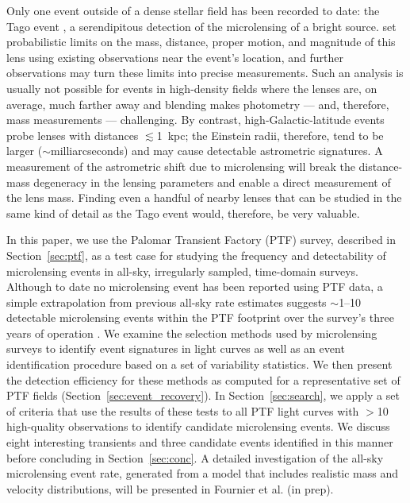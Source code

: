 \documentclass{emulateapj}
\begin{document}
Only one event outside of a dense stellar field has been recorded to date: the Tago event \citep{fukui2007, gaudi2008}, a serendipitous detection of the microlensing of a bright source. \cite{gaudi2008} set probabilistic limits on the mass, distance, proper motion, and magnitude of this lens using existing observations near the event's location, and further observations may turn these limits into precise measurements. Such an analysis is usually not possible for events in high-density fields where the lenses are, on average, much farther away and blending makes photometry --- and, therefore, mass measurements --- challenging. By contrast, high-Galactic-latitude events probe lenses with distances $\lesssim$1~kpc; the Einstein radii, therefore, tend to be larger ($\sim$milliarcseconds) and may cause detectable astrometric signatures. A measurement of the astrometric shift due to microlensing will break the distance-mass degeneracy in the lensing parameters and enable a direct measurement of the lens mass. Finding even a handful of nearby lenses that can be studied in the same kind of detail as the Tago event would, therefore, be very valuable. 

In this paper, we use the Palomar Transient Factory (PTF) survey, described in Section~\ref{sec:ptf}, as a test case for studying the frequency and detectability of microlensing events in all-sky, irregularly sampled, time-domain surveys. Although to date no microlensing event has been reported using PTF data, a simple extrapolation from previous all-sky rate estimates suggests $\sim$1--10 detectable microlensing events within the PTF footprint over the survey's three years of operation \citep{han2008, gaudi2008}. We examine the selection methods used by microlensing surveys to identify event signatures in light curves as well as an event identification procedure based on a set of variability statistics. We then present the detection efficiency for these methods as computed for a representative set of PTF fields (Section~\ref{sec:event_recovery}). In Section~\ref{sec:search}, we apply a set of criteria that use the results of these tests to all PTF light curves with $>$10 high-quality observations to identify candidate microlensing events. We discuss eight interesting transients and three candidate events identified in this manner before concluding in Section~\ref{sec:conc}. A detailed investigation of the all-sky microlensing event rate,  generated from a model that includes realistic mass and velocity distributions, will be presented in Fournier et al. (in prep).
\end{document}
